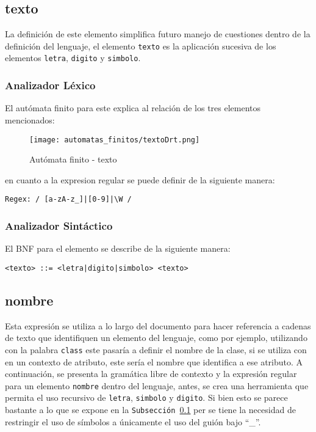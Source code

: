 \subsection{texto}
\label{sub:texto}
La definición de este elemento simplifica futuro manejo de cuestiones dentro de
la definición del lenguaje, el elemento \texttt{texto} es la aplicación
sucesiva de los elementos \texttt{letra}, \texttt{digito} y \texttt{simbolo}.

\subsubsection{Analizador Léxico}

El autómata finito para este explica al relación de los tres elementos
mencionados:

\begin{figure}[H]
	\centering
	\texttt{[image: automatas\_finitos/textoDrt.png]}
	\caption{Autómata finito - texto}
	\label{fig:texto}
\end{figure}

en cuanto a la expresion regular se puede definir de la siguiente manera:

\begin{lstlisting}[basicstyle=\footnotesize\ttfamily, caption={Regex - texto}]
  Regex: / [a-zA-z_]|[0-9]|\W /
\end{lstlisting}

\subsubsection{Analizador Sintáctico}

El BNF para el elemento se describe de la siguiente manera:

\begin{lstlisting}[basicstyle=\footnotesize\ttfamily, caption={BNF - texto}]
  <texto> ::= <letra|digito|simbolo> <texto>
\end{lstlisting}

\subsection{nombre}
\label{sub:nombre}
Esta expresión se utiliza a lo largo del documento para hacer referencia a
cadenas de texto que identifiquen un elemento del lenguaje, como por ejemplo,
utilizando con la palabra \texttt{class} este pasaría a definir el nombre de la
clase, si se utiliza con en un contexto de atributo, este sería
el nombre que identifica a ese atributo. A continuación, se presenta la
gramática libre de contexto y la expresión regular para un elemento
\texttt{nombre} dentro del lenguaje, antes, se crea una herramienta que permita el uso
recursivo de \texttt{letra}, \texttt{simbolo} y \texttt{digito}.
Si bien esto se parece bastante a lo que se expone en la \texttt{Subsección
\ref{sub:texto}} per se tiene la necesidad de restringir el uso de símbolos
a únicamente el uso del guión bajo ``\_''.

